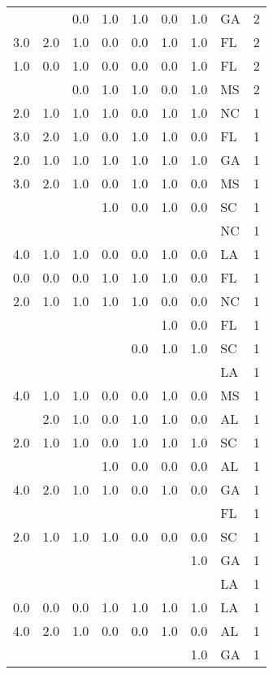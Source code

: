 \begin{tabular}{llllllllr}
    &     & 0.0 & 1.0 & 1.0 & 0.0 & 1.0 & GA &     2 \\
3.0 & 2.0 & 1.0 & 0.0 & 0.0 & 1.0 & 1.0 & FL &     2 \\
1.0 & 0.0 & 1.0 & 0.0 & 0.0 & 0.0 & 1.0 & FL &     2 \\
    &     & 0.0 & 1.0 & 1.0 & 0.0 & 1.0 & MS &     2 \\
2.0 & 1.0 & 1.0 & 1.0 & 0.0 & 1.0 & 1.0 & NC &     1 \\
3.0 & 2.0 & 1.0 & 0.0 & 1.0 & 1.0 & 0.0 & FL &     1 \\
2.0 & 1.0 & 1.0 & 1.0 & 1.0 & 1.0 & 1.0 & GA &     1 \\
3.0 & 2.0 & 1.0 & 0.0 & 1.0 & 1.0 & 0.0 & MS &     1 \\
    &     &     & 1.0 & 0.0 & 1.0 & 0.0 & SC &     1 \\
    &     &     &     &     &     &     & NC &     1 \\
4.0 & 1.0 & 1.0 & 0.0 & 0.0 & 1.0 & 0.0 & LA &     1 \\
0.0 & 0.0 & 0.0 & 1.0 & 1.0 & 1.0 & 0.0 & FL &     1 \\
2.0 & 1.0 & 1.0 & 1.0 & 1.0 & 0.0 & 0.0 & NC &     1 \\
    &     &     &     &     & 1.0 & 0.0 & FL &     1 \\
    &     &     &     & 0.0 & 1.0 & 1.0 & SC &     1 \\
    &     &     &     &     &     &     & LA &     1 \\
4.0 & 1.0 & 1.0 & 0.0 & 0.0 & 1.0 & 0.0 & MS &     1 \\
    & 2.0 & 1.0 & 0.0 & 1.0 & 1.0 & 0.0 & AL &     1 \\
2.0 & 1.0 & 1.0 & 0.0 & 1.0 & 1.0 & 1.0 & SC &     1 \\
    &     &     & 1.0 & 0.0 & 0.0 & 0.0 & AL &     1 \\
4.0 & 2.0 & 1.0 & 1.0 & 0.0 & 1.0 & 0.0 & GA &     1 \\
    &     &     &     &     &     &     & FL &     1 \\
2.0 & 1.0 & 1.0 & 1.0 & 0.0 & 0.0 & 0.0 & SC &     1 \\
    &     &     &     &     &     & 1.0 & GA &     1 \\
    &     &     &     &     &     &     & LA &     1 \\
0.0 & 0.0 & 0.0 & 1.0 & 1.0 & 1.0 & 1.0 & LA &     1 \\
4.0 & 2.0 & 1.0 & 0.0 & 0.0 & 1.0 & 0.0 & AL &     1 \\
    &     &     &     &     &     & 1.0 & GA &     1 \\

\end{tabular}
